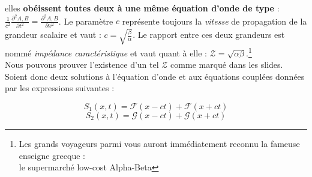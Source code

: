 elles \textbf{obéissent toutes deux à une même équation d'onde de type} : $\frac{1}{c^{2}} \frac{\partial^{2} A,B}{\partial t^{2}} = \frac{\partial^{2} A,B}{\partial x^{2}}$. 
Le paramètre $c$ représente toujours la \textit{vitesse} de propagation de la grandeur scalaire et vaut : $c = \sqrt{\frac{\beta}{\alpha}}$. 
Le rapport entre ces deux grandeurs est nommé \textit{impédance caractéristique} et vaut quant à elle : $\mathcal{Z} = \sqrt{\alpha\beta}$.\footnote{Les grands voyageurs parmi vous auront immédiatement reconnu la fameuse enseigne grecque :\\ le supermarché low-cost Alpha-Beta}\\ 

Nous pouvons prouver l'existence d'un tel $\mathcal{Z}$ comme marqué dans les slides. Soient donc deux solutions à l'équation d'onde et aux équations couplées données par les expressions suivantes :

\[S_{1}(x,t) = \mathcal{F}(x-ct) + \mathcal{F}(x+ct)\]
\[S_{2}(x,t) = \mathcal{G}(x-ct) + \mathcal{G}(x+ct)\]

